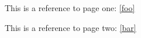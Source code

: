 \documentclass{article}
\begin{document}
This is a reference to page one: \ref{foo}

This is a reference to page two: \ref{bar}
\end{document}
